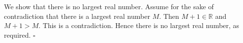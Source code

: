We show that there is no largest real number.
Assume for the sake of contradiction that there is a largest real number $M$.
Then $M + 1 \in \mathbb{R}$ and $M + 1 > M$.
This is a contradiction.
Hence there is no largest real number, as required. \hfill$\square$
